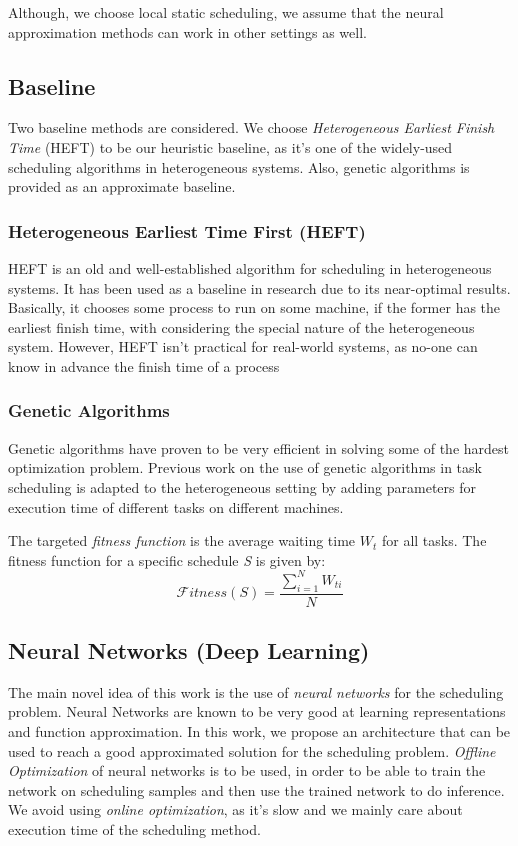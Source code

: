 Although, we choose local static scheduling, we assume that the neural approximation methods can work in other settings as well.

\subsection{Baseline}
Two baseline methods are considered. We choose \emph{Heterogeneous Earliest Finish Time} (HEFT) \cite{993206} to be our heuristic baseline, as it's one of the widely-used scheduling algorithms in heterogeneous systems. Also, genetic algorithms \cite{article2} is provided as an approximate baseline. \\

\subsubsection{Heterogeneous Earliest Time First (HEFT)}
HEFT \cite{993206} is an old and well-established algorithm for scheduling in heterogeneous systems. It has been used as a baseline in research due to its near-optimal results. Basically, it chooses some process to run on some machine, if the former has the earliest finish time, with considering the special nature of the heterogeneous system. However, HEFT isn't practical for real-world systems, as no-one can know in advance the finish time of a process \\

\subsubsection{Genetic Algorithms}
Genetic algorithms \cite{article2} have proven to be very efficient in solving some of the hardest optimization problem. Previous work on the use of genetic algorithms in task scheduling \cite{article2} is adapted to the heterogeneous setting by adding parameters for execution time of different tasks on different machines.

The targeted \emph{fitness function} is the average waiting time $W_t$ for all tasks. The fitness function for a specific schedule \emph{S} is given by:
\begin{equation}
\mathcal Fitness(S) = \frac{\sum_{i=1}^{N} W_{ti}}{N} \label{eq:ga}
\end{equation}

\subsection{Neural Networks (Deep Learning)}
The main novel idea of this work is the use of \emph{neural networks} for the scheduling problem. Neural Networks are known to be very good at learning representations and function approximation. In this work, we propose an architecture that can be used to reach a good approximated solution for the scheduling problem. \emph{Offline Optimization} of neural networks is to be used, in order to be able to train the network on scheduling samples and then use the trained network to do inference. We avoid using \emph{online optimization}, as it's slow and we mainly care about execution time of the scheduling method.

